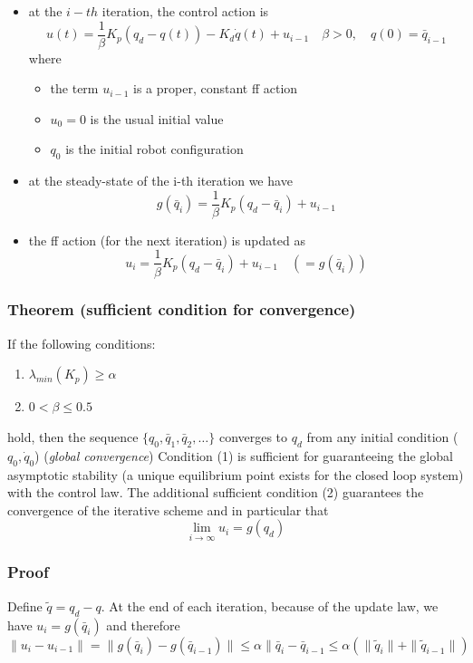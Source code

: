 \documentclass{book}
\begin{document}
\begin{itemize}
    \item at the $i-th$ iteration, the control action is \[
            u(t) =\displaystyle\frac{1}{\beta}K_p(q_d-q(t))-K_d\dot{q}(t)+u_{i-1} \quad \beta>0,\quad q(0)=\bar{q}_{i-1}
            \] where \begin{itemize}
            \item the term $u_{i-1}$ is a proper, constant ff action 
            \item $u_0=0$ is the usual initial value 
            \item $q_0$ is the initial robot configuration
        \end{itemize}
    \item at the steady-state of the i-th iteration we have 
        \[
            g(\bar{q}_i) = \displaystyle\frac{1}{\beta} K_p(q_d-\bar{q}_i)+u_{i-1}
        \]
        \item the ff action (for the next iteration) is updated as 
            \[
                u_i = \displaystyle\frac{1}{\beta}K_p(q_d-\bar{q}_i)+u_{i-1} \quad (=g(\bar{q}_i))
            \]
\end{itemize}
\subsubsection{Theorem (sufficient condition for convergence)}
If the following conditions:
\begin{enumerate}
    \item $\lambda_{min}(K_p)\geq \alpha$
    \item  $0<\beta\leq 0.5$
\end{enumerate}
hold, then the sequence $\{q_0,\bar{q}_1,\bar{q}_2,\dots\}$ converges to $q_d$ from any initial condition ($q_0,\dot{q}_0$) (\emph{global convergence})
Condition (1) is sufficient for guaranteeing the global asymptotic stability (a unique equilibrium point exists for the closed loop system) with the control law. The additional sufficient condition (2) guarantees the convergence of the iterative scheme and in particular that 
\[
    \lim_{i\to\infty} u_i = g(q_d)
\]
\subsubsection{Proof}
Define $\tilde{q}=q_d-q$. At the end of each iteration, because of the update law, we have $u_i=g(\bar{q}_i)$ and therefore 
\[
    \|u_i-u_{i-1}\| = \| g(\bar{q}_i)-g(\bar{q}_{i-1}) \| \leq \alpha\|\bar{q}_i-\bar{q}_{i-1} \leq \alpha(\|\tilde{q}_i\| + \|\tilde{q}_{i-1}\|)
\]
\end{document}

